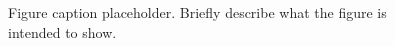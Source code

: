 \begin{figure}[t]
\centering
{}
\caption{Figure caption placeholder. Briefly describe what the figure is intended to show.}
\label{fig:placeholder}
\end{figure}
